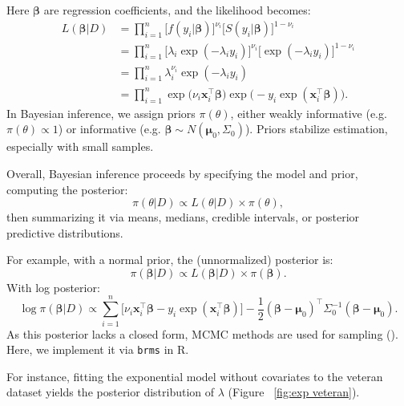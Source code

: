 Here $\boldsymbol{\beta}$ are regression coefficients, and the likelihood becomes:
\begin{align*}
L(\boldsymbol{\beta} | D)
&= \prod_{i=1}^n 
\big[ f(y_i | \boldsymbol{\beta}) \big]^{\nu_i}
\big[ S(y_i | \boldsymbol{\beta}) \big]^{1 - \nu_i} \\
&= \prod_{i=1}^n 
\big[ \lambda_i \exp(-\lambda_i y_i) \big]^{\nu_i}
\big[ \exp(-\lambda_i y_i) \big]^{1 - \nu_i} \\
&= \prod_{i=1}^n 
\lambda_i^{\nu_i} 
\exp(-\lambda_i y_i) \\
&= \prod_{i=1}^n 
\exp\big( \nu_i \mathbf{x}_i^\top \boldsymbol{\beta} \big)
\exp\big( - y_i \exp(\mathbf{x}_i^\top \boldsymbol{\beta}) \big).
\end{align*}
In Bayesian inference, we assign priors $\pi(\theta)$, either weakly informative (e.g. $\pi(\theta)\propto1$) or informative (e.g. $\boldsymbol{\beta} \sim N(\boldsymbol{\mu}_0, \Sigma_0)$). Priors stabilize estimation, especially with small samples.

Overall, Bayesian inference proceeds by specifying the model and prior, computing the posterior:
$$
\pi(\theta | D)
\propto
L(\theta | D) \times \pi(\theta),
$$
then summarizing it via means, medians, credible intervals, or posterior predictive distributions.

For example, with a normal prior, the (unnormalized) posterior is:
$$
\pi(\boldsymbol{\beta} | D)
\propto
L(\boldsymbol{\beta} | D)
\times
\pi(\boldsymbol{\beta}).
$$
With log posterior:
$$
\log \pi(\boldsymbol{\beta} | D)
\propto \sum_{i=1}^n
\big[ \nu_i \mathbf{x}_i^\top \boldsymbol{\beta}
- y_i \exp(\mathbf{x}_i^\top \boldsymbol{\beta}) \big]
- \frac{1}{2}
(\boldsymbol{\beta} - \boldsymbol{\mu}_0)^\top
\Sigma_0^{-1}
(\boldsymbol{\beta} - \boldsymbol{\mu}_0).
$$
As this posterior lacks a closed form, MCMC methods are used for sampling (\cite{stats5010006}). Here, we implement it via \texttt{brms} in R.

For instance, fitting the exponential model without covariates to the veteran dataset yields the posterior distribution of $\lambda$ (Figure ~\ref{fig:exp veteran}).

